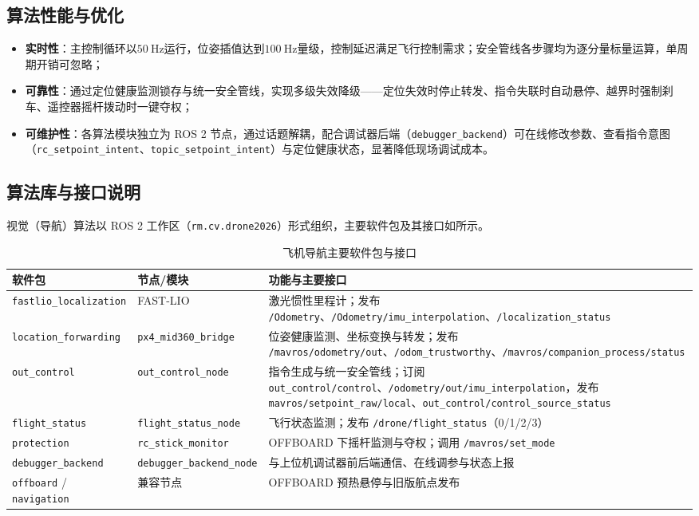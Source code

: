 \subsection{算法性能与优化}
\begin{itemize}
    \item \textbf{实时性}：主控制循环以$\qty{50}{\Hz}$运行，位姿插值达到$\qty{100}{\Hz}$量级，控制延迟满足飞行控制需求；安全管线各步骤均为逐分量标量运算，单周期开销可忽略；
    \item \textbf{可靠性}：通过定位健康监测锁存与统一安全管线，实现多级失效降级——定位失效时停止转发、指令失联时自动悬停、越界时强制刹车、遥控器摇杆拨动时一键夺权；
    \item \textbf{可维护性}：各算法模块独立为 ROS 2 节点，通过话题解耦，配合调试器后端（\lstinline{debugger_backend}）可在线修改参数、查看指令意图（\lstinline{rc_setpoint_intent}、\lstinline{topic_setpoint_intent}）与定位健康状态，显著降低现场调试成本。
\end{itemize}

\subsection{算法库与接口说明}
视觉（导航）算法以 ROS 2 工作区（\lstinline{rm.cv.drone2026}）形式组织，主要软件包及其接口如所示。

\begin{table}[hbt!]
\centering
\begin{tabular}{m{4.5cm}<{\centering}m{5cm}<{\centering}m{6cm}<{\centering}}
    \hline
    软件包 & 节点/模块 & 功能与主要接口 \\
    \hline
    \texttt{fastlio\_localization} & FAST-LIO & 激光惯性里程计；发布 \texttt{/Odometry}、\texttt{/Odometry/imu\_interpolation}、\texttt{/localization\_status} \\
    \texttt{location\_forwarding} & \texttt{px4\_mid360\_bridge} & 位姿健康监测、坐标变换与转发；发布 \texttt{/mavros/odometry/out}、\texttt{/odom\_trustworthy}、\texttt{/mavros/companion\_process/status} \\
    \texttt{out\_control} & \texttt{out\_control\_node} & 指令生成与统一安全管线；订阅 \texttt{out\_control/control}、\texttt{/odometry/out/imu\_interpolation}，发布 \texttt{mavros/setpoint\_raw/local}、\texttt{out\_control/control\_source\_status} \\
    \texttt{flight\_status} & \texttt{flight\_status\_node} & 飞行状态监测；发布 \texttt{/drone/flight\_status}（0/1/2/3） \\
    \texttt{protection} & \texttt{rc\_stick\_monitor} & OFFBOARD 下摇杆监测与夺权；调用 \texttt{/mavros/set\_mode} \\
    \texttt{debugger\_backend} & \texttt{debugger\_backend\_node} & 与上位机调试器前后端通信、在线调参与状态上报 \\
    \texttt{offboard} / \texttt{navigation} & 兼容节点 & OFFBOARD 预热悬停与旧版航点发布 \\
    \hline
\end{tabular}
\caption{飞机导航主要软件包与接口}
\label{tab:飞机导航软件包}
\end{table}

